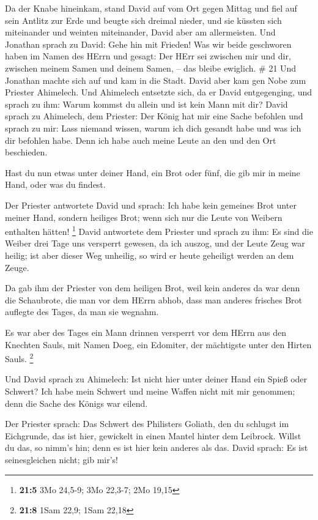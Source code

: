  Da der Knabe hineinkam, stand David auf vom Ort gegen
Mittag und fiel auf sein Antlitz zur Erde und beugte sich dreimal
nieder, und sie küssten sich miteinander und weinten miteinander, David
aber am allermeisten.  Und Jonathan sprach zu David: Gehe
hin mit Frieden! Was wir beide geschworen haben im Namen des HErrn und
gesagt: Der HErr sei zwischen mir und dir, zwischen meinem Samen und
deinem Samen, -- das bleibe ewiglich. \# 21  Und Jonathan
machte sich auf und kam in die Stadt.  David aber kam gen
Nobe zum Priester Ahimelech. Und Ahimelech entsetzte sich, da er David
entgegenging, und sprach zu ihm: Warum kommst du allein und ist kein
Mann mit dir?  David sprach zu Ahimelech, dem Priester: Der
König hat mir eine Sache befohlen und sprach zu mir: Lass niemand
wissen, warum ich dich gesandt habe und was ich dir befohlen habe. Denn
ich habe auch meine Leute an den und den Ort beschieden.

 Hast du nun etwas unter deiner Hand, ein Brot oder fünf,
die gib mir in meine Hand, oder was du findest.

 Der Priester antwortete David und sprach: Ich habe kein
gemeines Brot unter meiner Hand, sondern heiliges Brot; wenn sich nur
die Leute von Weibern enthalten hätten! \footnote{\textbf{21:5} 3Mo
  24,5-9; 3Mo 22,3-7; 2Mo 19,15}  David antwortete dem
Priester und sprach zu ihm: Es sind die Weiber drei Tage uns versperrt
gewesen, da ich auszog, und der Leute Zeug war heilig; ist aber dieser
Weg unheilig, so wird er heute geheiligt werden an dem Zeuge.

 Da gab ihm der Priester von dem heiligen Brot, weil kein
anderes da war denn die Schaubrote, die man vor dem HErrn abhob, dass
man anderes frisches Brot auflegte des Tages, da man sie wegnahm.

 Es war aber des Tages ein Mann drinnen versperrt vor dem
HErrn aus den Knechten Sauls, mit Namen Doeg, ein Edomiter, der
mächtigste unter den Hirten Sauls. \footnote{\textbf{21:8} 1Sam 22,9;
  1Sam 22,18}

 Und David sprach zu Ahimelech: Ist nicht hier unter deiner
Hand ein Spieß oder Schwert? Ich habe mein Schwert und meine Waffen
nicht mit mir genommen; denn die Sache des Königs war eilend.

 Der Priester sprach: Das Schwert des Philisters Goliath,
den du schlugst im Eichgrunde, das ist hier, gewickelt in einen Mantel
hinter dem Leibrock. Willst du das, so nimm's hin; denn es ist hier kein
anderes als das. David sprach: Es ist seinesgleichen nicht; gib mir's!

